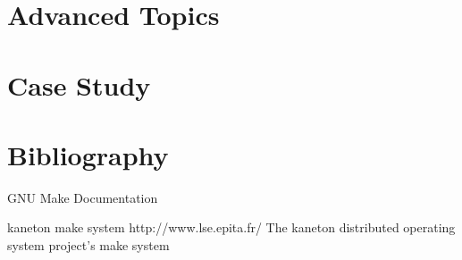\documentclass[8pt]{beamer}
\begin{document}

\section{Advanced Topics}

\section{Case Study}

%
%

\section{Bibliography}

\begin{thebibliography}{3}
    GNU Make Documentation

    kaneton make system
    \newblock http://www.lse.epita.fr/
    \newblock The kaneton distributed operating system project's make system
\end{thebibliography}
\end{document}
